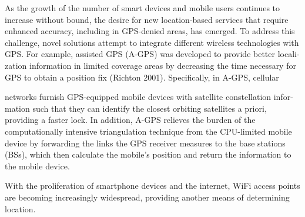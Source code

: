 As the growth of the number of smart devices and mobile users continues to
increase without bound, the desire for new location-based services that require
enhanced accuracy, including in GPS-denied areas, has emerged. To address this
challenge, novel solutions attempt to integrate different wireless technologies with
GPS. For example, assisted GPS (A-GPS) was developed to provide better locali-
zation information in limited coverage areas by decreasing the time necessary for
GPS to obtain a position fix (Richton 2001). Specifically, in A-GPS, cellular

networks furnish GPS-equipped mobile devices with satellite constellation infor-
mation such that they can identify the closest orbiting satellites a priori, providing a
faster lock. In addition, A-GPS relieves the burden of the computationally intensive
triangulation technique from the CPU-limited mobile device by forwarding the links
the GPS receiver measures to the base stations (BSs), which then calculate the
mobile’s position and return the information to the mobile device.



With the proliferation of smartphone devices and the internet,
WiFi access points are becoming increasingly widespread, 
providing another means of determining location.


